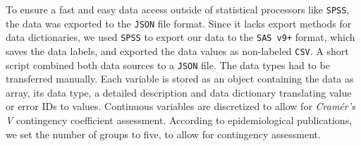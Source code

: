 \documentclass[journal]{style/vgtc} 			          %
\begin{document}
To ensure a fast and easy data access outside of statistical processors like \texttt{SPSS}, the data was exported to the \texttt{JSON} file format.
%
Since it lacks export methods for data dictionaries, we used \texttt{SPSS} to export our data to the \texttt{SAS v9+} format, which saves the data labels, and exported the data values as non-labeled \texttt{CSV}.
%
A short script combined both data sources to a \texttt{JSON} file.
%
The data types had to be transferred manually.
%
Each variable is stored as an object containing the data as array, its data type, a detailed description and data dictionary translating value or error IDs to values.
%
Continuous variables are discretized to allow for \emph{Cram\'{e}r's V} contingency coefficient assessment.
%
According to epidemiological publications, we set the number of groups to five, to allow for contingency assessment.
\end{document}
